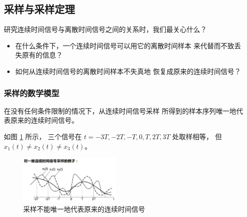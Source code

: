 \subsection{采样与采样定理}

研究连续时间信号与离散时间信号之间的关系时，我们最关心什么？
\begin{itemize}
    \item 在什么条件下，一个连续时间信号可以用它的离散时间样本
        来代替而不致丢失原有的信息？
    \item 如何从连续时间信号的离散时间样本不失真地
        恢复成原来的连续时间信号？
\end{itemize}

\subsubsection{采样的数学模型}

\begin{property}
    在没有任何条件限制的情况下，从连续时间信号采样
    所得到的样本序列唯一地代表原来的连续时间信号。
\end{property}

\begin{example}
    如图 \ref{fig:counterexample-sampling} 所示，
    三个信号在 $t = -3T, -2T, -T, 0, T, 2T, 3T$ 处取样相等，
    但 $x_1(t) \neq x_2(t) \neq x_3(t)$。
    \begin{figure}[H]
        \centering
        \includegraphics[width=0.45\textwidth]{chap2/img/counterexample-sampling.png}
        \caption{采样不能唯一地代表原来的连续时间信号}
        \label{fig:counterexample-sampling}
    \end{figure}
\end{example}

